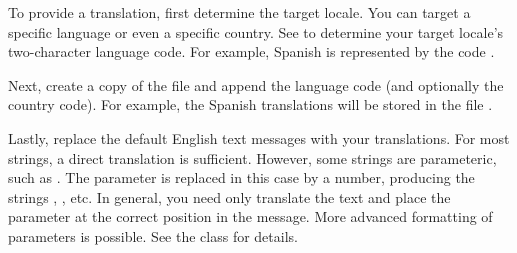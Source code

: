 To provide a translation, first determine the target locale.  You can target a specific language or even a specific country.  See  to determine your target locale's two-character language code.  For example, Spanish is represented by the code .

Next, create a copy of the  file and append the language code (and optionally the country code).  For example, the Spanish translations will be stored in the file .

Lastly, replace the default English text messages with your translations.  For most strings, a direct translation is sufficient.  However, some strings are parameteric, such as .  The parameter  is replaced in this case by a number, producing the strings , , etc.  In general, you need only translate the text and place the parameter at the correct position in the message.  More advanced formatting of parameters is possible.  See the  class for details.